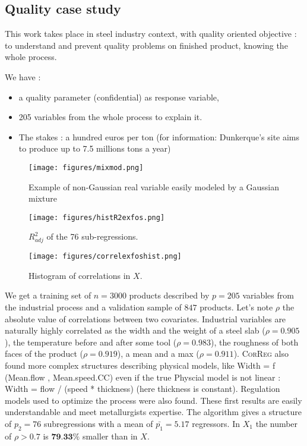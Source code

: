 \documentclass[11pt,a4paper]{article}
\begin{document}
\subsection{Quality case study}
This work takes place in steel industry context, with quality oriented objective : to understand and prevent quality problems on finished product, knowing the whole process. 
		
We have :
		\begin{itemize}
			\item a quality parameter (confidential) as response variable,
			\item 205 variables from the whole process to explain it.
			\item The stakes : a hundred euros per ton (for information: Dunkerque's  site aims to produce up to 7.5 millions tons a year)
		\end{itemize}
		
\begin{figure}[h!]
	\begin{minipage}[l]{.30\linewidth}
			\texttt{[image: figures/mixmod.png]} 
			\caption{Example of non-Gaussian real variable easily modeled by a Gaussian mixture}\label{graphMixmod}
	\end{minipage} \hfill
	\begin{minipage}[c]{.30\linewidth}
			\texttt{[image: figures/histR2exfos.png]} 
			\caption{$R^2_{adj}$ of the 76 sub-regressions.}
	\end{minipage} \hfill
   \begin{minipage}[r]{.30\linewidth}
			\texttt{[image: figures/correlexfoshist.png]} 
			\caption{Histogram of correlations in $X$.} \label{compareMSEexfos}
   \end{minipage}
\end{figure}   			
	We get a training set of $n=3 000$ products described by $p=205$ variables from the industrial process and a validation sample of $847$ products.
	Let's note $\rho$ the absolute value of correlations between two covariates. Industrial variables are naturally highly correlated as the width and the weight of a steel slab ($\rho=0.905$), the temperature before and after some tool ($\rho=0.983$), the  roughness of both faces of the product ($\rho= 0.919$), a mean and a max ($\rho=0.911$). \textsc{CorReg} also found more complex structures describing physical models, like   Width = f (Mean.flow , Mean.speed.CC) even if the true Physcial model is not linear : Width = flow / (speed * thickness) (here thickness is constant). Regulation models used to optimize the process were also found. These first results are easily understandable and meet metallurgists expertise.  
			The algorithm gives a structure of $p_2=76$ subregressions with a mean of $\bar{p_1}=5.17$ regressors. In $X_1$ the number of $\rho>0.7$ is $\textbf{79.33\%}$ smaller than in $X$.		
	
\end{document}
